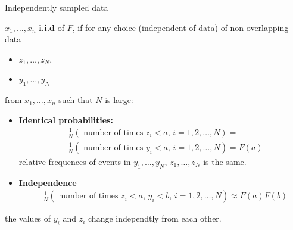 \documentclass{beamer}
\begin{document}
 \begin{frame}{Independently sampled data}

     $x_1,\ldots, x_n$ \textbf{i.i.d} of $F$, if for any
     choice (independent of data) of non-overlapping  
     data 
     \begin{itemize}
     \item
     $z_1,\ldots, z_N$, 
     \item     
     $y_1,\ldots, y_N$ 
     \end{itemize}
     from $x_1,\ldots, x_n$ such that $N$ is large:


     \begin{itemize}
     \item \textbf{Identical probabilities:}
     \[
     \begin{split}
      &	 \frac{1}{N} (\mbox{ number of times $z_i < a$, $i=1,2,\ldots,N$}) = \\
      &	 \frac{1}{N} (\mbox{ number of times $y_i < a$, $i=1,2,\ldots,N$})=F(a)
     \end{split}
    \]
    relative frequences of events in $y_1,\ldots,y_N$, $z_1,\ldots,z_N$
    is the same. 
    \item \textbf{Independence}
    \[
     \begin{split}
      &	 \frac{1}{N} (\mbox{ number of times $z_i < a$, $y_i < b$,
           $i=1,2,\ldots,N$}) \approx F(a)F(b)
     \end{split}
    \]
    \end{itemize}
    the values of $y_i$ and $z_i$ change independtly from each other. 

\end{frame}
\end{document}
